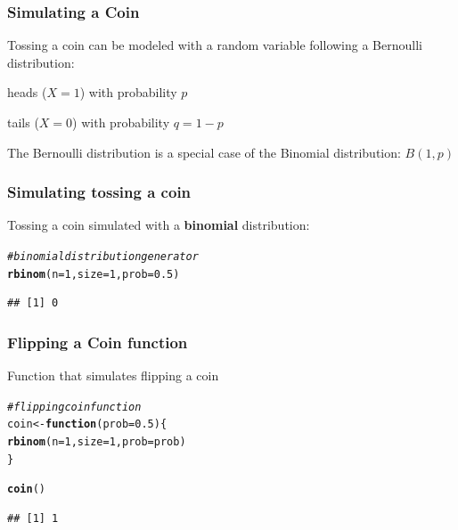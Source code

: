\documentclass[12pt]{beamer}\usepackage[]{graphicx}\usepackage[]{color}
\makeatletter
\newcommand{\hlnum}[1]{\textcolor[rgb]{0.686,0.059,0.569}{#1}}%
\newcommand{\hlcom}[1]{\textcolor[rgb]{0.678,0.584,0.686}{\textit{#1}}}%
\newcommand{\hlstd}[1]{\textcolor[rgb]{0.345,0.345,0.345}{#1}}%
\newcommand{\hlkwa}[1]{\textcolor[rgb]{0.161,0.373,0.58}{\textbf{#1}}}%
\newcommand{\hlkwb}[1]{\textcolor[rgb]{0.69,0.353,0.396}{#1}}%
\newcommand{\hlkwc}[1]{\textcolor[rgb]{0.333,0.667,0.333}{#1}}%
\newcommand{\hlkwd}[1]{\textcolor[rgb]{0.737,0.353,0.396}{\textbf{#1}}}%
\newenvironment{kframe}{%
 \def\at@end@of@kframe{}%
 \ifinner\ifhmode%
  \def\at@end@of@kframe{\end{minipage}}%
  \begin{minipage}{\columnwidth}%
 \fi\fi%
 \def\FrameCommand##1{\hskip\@totalleftmargin \hskip-\fboxsep
 \colorbox{shadecolor}{##1}\hskip-\fboxsep
     \hskip-\linewidth \hskip-\@totalleftmargin \hskip\columnwidth}%
 \MakeFramed {\advance\hsize-\width
   \@totalleftmargin\z@ \linewidth\hsize
   \@setminipage}}%
 {\par\unskip\endMakeFramed%
 \at@end@of@kframe}
\newenvironment{knitrout}{}{} %
\makeatother
\begin{document}

\begin{frame}[fragile]
\frametitle{Simulating a Coin}

Tossing a coin can be modeled with a random variable following a Bernoulli distribution:
\bi
  \item heads ($X = 1$) with probability $p$
  \item tails ($X = 0$) with probability $q = 1 - p$
\ei

\bigskip
{\footnotesize The Bernoulli distribution is a special case of the Binomial distribution: $B(1, p)$}

\end{frame}


\begin{frame}[fragile]
\frametitle{Simulating tossing a coin}

Tossing a coin simulated with a \textbf{binomial} distribution: 
\begin{knitrout}\footnotesize
{}\color{fgcolor}\begin{kframe}
\begin{alltt}
\hlcom{# binomial distribution generator}
\hlkwd{rbinom}\hlstd{(}\hlkwc{n} \hlstd{=} \hlnum{1}\hlstd{,} \hlkwc{size} \hlstd{=} \hlnum{1}\hlstd{,} \hlkwc{prob} \hlstd{=} \hlnum{0.5}\hlstd{)}
\end{alltt}
\begin{verbatim}
## [1] 0
\end{verbatim}
\end{kframe}
\end{knitrout}

\end{frame}


\begin{frame}[fragile]
\frametitle{Flipping a Coin function}

Function that simulates flipping a coin
\begin{knitrout}\footnotesize
{}\color{fgcolor}\begin{kframe}
\begin{alltt}
\hlcom{# flipping coin function}
\hlstd{coin} \hlkwb{<-} \hlkwa{function}\hlstd{(}\hlkwc{prob} \hlstd{=} \hlnum{0.5}\hlstd{) \{}
  \hlkwd{rbinom}\hlstd{(}\hlkwc{n} \hlstd{=} \hlnum{1}\hlstd{,} \hlkwc{size} \hlstd{=} \hlnum{1}\hlstd{,} \hlkwc{prob} \hlstd{= prob)}
\hlstd{\}}

\hlkwd{coin}\hlstd{()}
\end{alltt}
\begin{verbatim}
## [1] 1
\end{verbatim}
\end{kframe}
\end{knitrout}

\end{frame}
\end{document}
